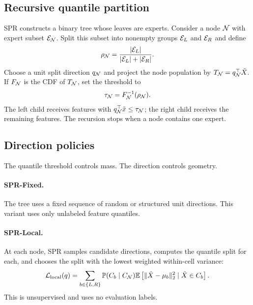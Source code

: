 \subsection{Recursive quantile partition}

SPR constructs a binary tree whose leaves are experts.  Consider a node
$\mathcal{N}$ with expert subset $\mathcal{E}_{\mathcal{N}}$.  Split this subset into
nonempty groups $\mathcal{E}_L$ and $\mathcal{E}_R$ and define
\begin{equation}
  \rho_{\mathcal{N}}=
  \frac{|\mathcal{E}_L|}{|\mathcal{E}_L|+|\mathcal{E}_R|}.
\end{equation}
Choose a unit split direction $q_{\mathcal{N}}$ and project the node population by
$T_{\mathcal{N}}=q_{\mathcal{N}}^{\top}\tilde X$.  If $F_{\mathcal{N}}$ is the CDF of
$T_{\mathcal{N}}$, set the threshold to
\begin{equation}
  \tau_{\mathcal{N}}=F_{\mathcal{N}}^{-1}(\rho_{\mathcal{N}}).
\end{equation}
The left child receives features with
$q_{\mathcal{N}}^{\top}\tilde x\le \tau_{\mathcal{N}}$; the right child receives the
remaining features.  The recursion stops when a node contains one expert.

\subsection{Direction policies}

The quantile threshold controls mass.  The direction controls geometry.

\paragraph{SPR-Fixed.}
The tree uses a fixed sequence of random or structured unit directions.  This
variant uses only unlabeled feature quantiles.

\paragraph{SPR-Local.}
At each node, SPR samples candidate directions, computes the quantile split for
each, and chooses the split with the lowest weighted within-cell variance:
\begin{equation}
  \mathcal{L}_{\mathrm{local}}(q)=
  \sum_{b\in\{L,R\}}\mathbb{P}(C_b\mid C_{\mathcal{N}})
  \mathbb{E}\left[\|\tilde X-\mu_b\|_2^2\mid \tilde X\in C_b\right].
\end{equation}
This is unsupervised and uses no evaluation labels.

